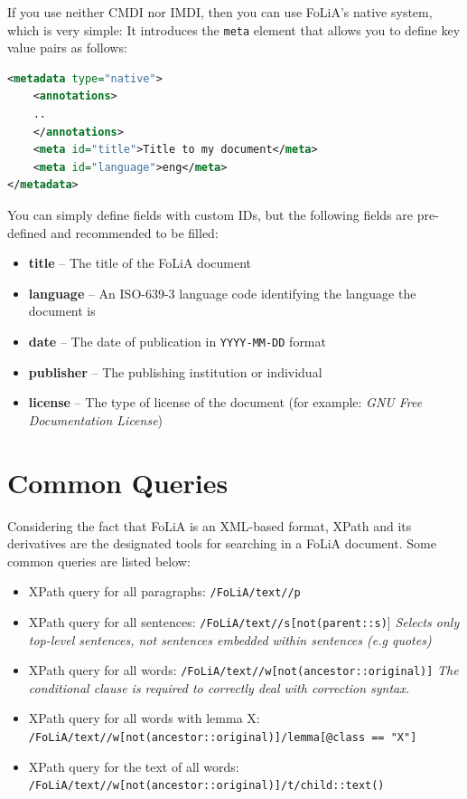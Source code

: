 \documentclass[a4paper,12pt]{report}
\begin{document}
If you use neither CMDI nor IMDI, then you can use FoLiA's native system, which is very simple: It introduces the \texttt{meta} element that allows you to define key value pairs as follows:

\begin{lstlisting}[language=xml]
<metadata type="native">
    <annotations>
    ..
    </annotations>
    <meta id="title">Title to my document</meta>
    <meta id="language">eng</meta>
</metadata>
\end{lstlisting}

You can simply define fields with custom IDs, but the following fields are pre-defined and recommended to be filled:

\begin{itemize}
\item \textbf{title} -- The title of the FoLiA document
\item \textbf{language} -- An ISO-639-3 language code identifying the language the document is 
\item \textbf{date} -- The date of publication in \texttt{YYYY-MM-DD} format
\item \textbf{publisher} -- The publishing institution or individual
\item \textbf{license} -- The type of license of the document (for example: \emph{GNU Free Documentation License})
\end{itemize}



\appendix
\chapter{Common Queries}

Considering the fact that FoLiA is an XML-based format, XPath and its derivatives are the designated tools for searching in a FoLiA document. Some common queries are listed below:

\begin{itemize}
\item XPath query for all paragraphs: \texttt{/FoLiA/text//p}
\item XPath query for all sentences: \texttt{/FoLiA/text//s[not(parent::s)}] \emph{Selects only top-level sentences, not sentences embedded within sentences (e.g quotes)}
\item XPath query for all words: \texttt{/FoLiA/text//w[not(ancestor::original)]} \emph{The conditional clause is required to correctly deal with correction syntax.}
\item XPath query for all words with lemma X: \\ \texttt{/FoLiA/text//w[not(ancestor::original)]/lemma[@class == "X"]}
\item XPath query for the text of all words: \\ \texttt{/FoLiA/text//w[not(ancestor::original)]/t/child::text()}
\end{itemize}






\end{document}
